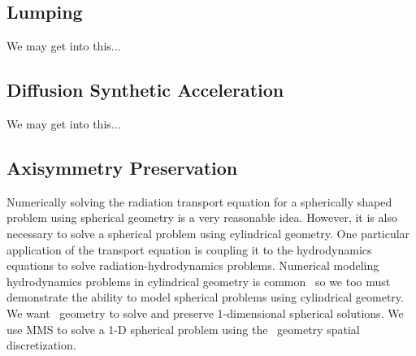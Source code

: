 \documentclass[12pt]{article}
\begin{document}
\FloatBarrier

{\color{red}
\subsection{Lumping}
We may get into this...
}

{\color{red}
\subsection{Diffusion Synthetic Acceleration}
We may get into this...
}


\subsection{Axisymmetry Preservation}
\label{sec:AxisymmetryPreservations}
Numerically solving the radiation transport equation for a spherically shaped problem using spherical geometry is a very reasonable idea. However, it is also necessary to solve a spherical problem using cylindrical geometry. One particular application of the transport equation is coupling it to the hydrodynamics equations to solve radiation-hydrodynamics problems. Numerical modeling hydrodynamics problems in cylindrical geometry is common~\cite{DobrevHOAxisymmetric} so we too must demonstrate the ability to model spherical problems using cylindrical geometry.
We want \RZ\ geometry to solve and preserve 1-dimensional spherical solutions. We use MMS to solve a 1-D spherical problem using the \RZ\ geometry spatial discretization.
\end{document}
